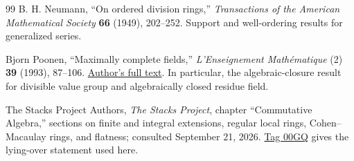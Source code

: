 \documentclass[11pt]{article}
\theoremstyle{definition}
\begin{document}
\begin{thebibliography}{99}
B. H. Neumann,
``On ordered division rings,''
\emph{Transactions of the American Mathematical Society} \textbf{66} (1949), 202--252.
Support and well-ordering results for generalized series.

Bjorn Poonen,
``Maximally complete fields,''
\emph{L'Enseignement Math\'ematique} (2) \textbf{39} (1993), 87--106.
\href{https://math.mit.edu/~poonen/papers/amsval.pdf}{Author's full text}.
In particular, the algebraic-closure result for divisible value group and algebraically closed residue field.

The Stacks Project Authors,
\emph{The Stacks Project}, chapter ``Commutative Algebra,''
sections on finite and integral extensions, regular local rings, Cohen--Macaulay rings, and flatness; consulted September 21, 2026.
\href{https://stacks.math.columbia.edu/tag/00GQ}{Tag 00GQ} gives the lying-over statement used here.

\end{thebibliography}
\end{document}
